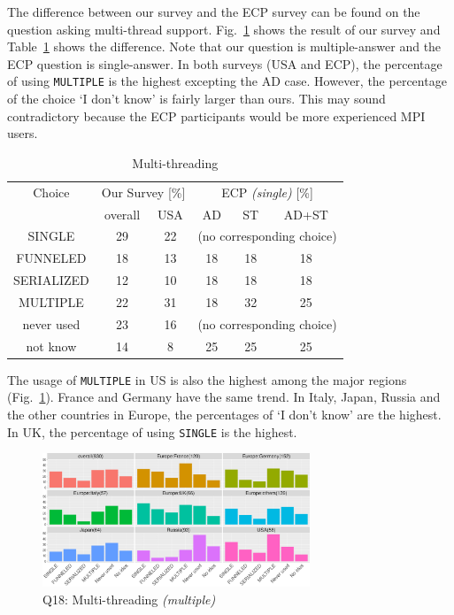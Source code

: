 \documentclass[conference,10pt,letterpaper]{IEEEtran}
\def\myquote#1{`#1'}
\begin{document}
The difference between our survey and the ECP survey can be found on
the question asking multi-thread support. Fig.~\ref{fig:multi-thread}
shows the result of our survey and Table~\ref{tab:multi-thread} shows
the difference. Note that our question is multiple-answer and the ECP
question is single-answer. In both surveys (USA and ECP), the
percentage of using {\tt MULTIPLE} is the highest excepting the AD
case. However, the percentage of the choice \myquote{I don't know}
is fairly larger than ours. This may sound contradictory because the
ECP participants would be more experienced MPI users.

\begin{table}[htb]%
  \begin{center}%
    \caption{Multi-threading}\label{tab:multi-thread}%
    \begin{tabular}{c||c|c||c|c|c}%
      \hline%
      Choice & \multicolumn{2}{c||}{Our Survey [\%]} & 
      \multicolumn{3}{c}{ECP {\it(single)} [\%]} \\
      \cline{2-6}%
      & overall & USA & AD & ST & AD+ST \\
      \hline%
      SINGLE & 29 & 22 & \multicolumn{3}{c}{\tiny (no corresponding choice)} \\
      FUNNELED & 18 & 13 & 18 & 18 & 18 \\
      SERIALIZED & 12 & 10 & 18 & 18 & 18 \\
      MULTIPLE & 22 & 31 & 18 & 32 & 25 \\
      never used & 23 & 16 & \multicolumn{3}{c}{\tiny (no corresponding choice)} \\
      not know & 14 & 8 & 25 & 25 & 25\\
      \hline%
    \end{tabular}%
  \end{center}%
\end{table}%

The usage of {\tt MULTIPLE} in US is also the highest among the major
regions (Fig.~\ref{fig:multi-thread}). France and Germany have the
same trend. In Italy, Japan, Russia and the
other countries in Europe, the percentages of \myquote{I don't know}
are the highest. In UK, the percentage of using {\tt SINGLE} is the
highest.

\begin{figure}[htb]
  \begin{center}
    \includegraphics[width=8cm]{R-scripts/Q18.pdf}
    \caption{Q18: Multi-threading {\it(multiple)}}
    \label{fig:multi-thread}
  \end{center}
\end{figure}
\end{document}
